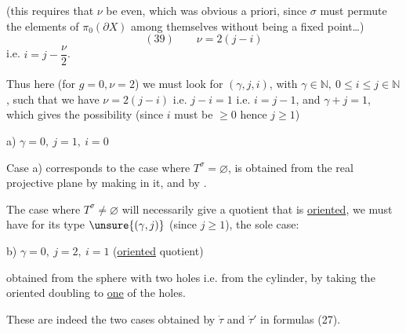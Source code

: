 (this requires that $\nu$ be even, which was obvious a priori, since $\sigma$ must permute the elements of $\pi_0(\partial X)$ among themselves without  being a fixed point\ldots)
\[
(39)\qquad \nu=2(j-i)
\]
i.e. \uline{$i=j-\dfrac{\nu}{2}$}.

Thus here (for $g=0,\nu=2$) we must look for $(\gamma,j,i)$, with $\gamma\in\mathbb N,\ 0\leq i\leq j\in\mathbb N$, such that we have $\nu=2(j-i)$ i.e. $j-i=1$ i.e. $i=j-1$, and $\gamma+j=1$, which gives the  possibility (since $i$ must be $\geq0$ hence $j\geq1$)

a) $\gamma=0,\ j=1,\ i=0$ 


Case a) corresponds to the case where  $T^\sigma=\varnothing$,  is obtained from the real projective plane by making   in it,  and by . 

The case where $T^\sigma\neq\varnothing$ will necessarily give a quotient  that is \uline{oriented}, we must have for its type $\unsure{(\gamma,j)}$ (since $j\geq1$), the sole case:


b) $\gamma=0,\ j=2,\ i=1$ (\uline{oriented} quotient)

obtained from the sphere with two holes i.e. from the cylinder, by taking the oriented doubling  to \uline{one} of the holes. 

These are indeed the two cases obtained  by $\dot\tau$ and $\dot\tau'$ in formulas (27).

